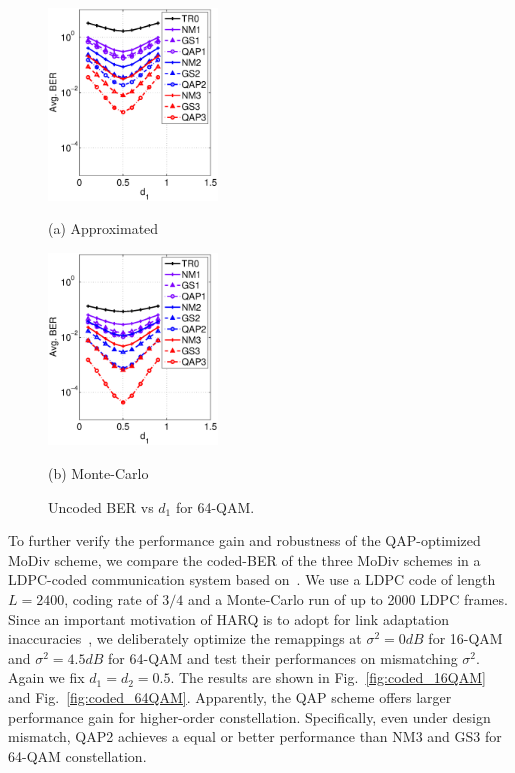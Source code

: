 \documentclass{article}
\begin{document}
\begin{figure}[htb]

  \begin{minipage}[b]{.48\linewidth}
    \centering
    \centerline{\includegraphics[width=4.5cm]{./figs/BER_distance_approx_64QAM.eps}}
    \centerline{(a) Approximated}\medskip
  \end{minipage}
  \hfill
  \begin{minipage}[b]{0.48\linewidth}
    \centering
    \centerline{\includegraphics[width=4.5cm]{./figs/BER_distance_MonteCarlo_64QAM.eps}}
    \centerline{(b) Monte-Carlo}\medskip
  \end{minipage}
  \caption{Uncoded BER vs $d_1$ for 64-QAM.}
  \label{fig:uncoded_position}
%
\end{figure}

To further verify the performance gain and robustness of the
QAP-optimized MoDiv scheme, we compare the coded-BER of the three MoDiv schemes
in a LDPC-coded communication system based on~\cite{hochwald2003achieving}. We
use a LDPC code of length $L=2400$, coding rate of $3/4$ and a Monte-Carlo run of up to 2000 LDPC
frames. Since an important motivation of HARQ is to adopt for link adaptation
inaccuracies~\cite{cheng2006coding}, we deliberately optimize the remappings at
$\sigma^2=0dB$ for 16-QAM and $\sigma^2=4.5dB$ for 64-QAM and test their performances on
mismatching $\sigma^2$. Again we fix $d_1=d_2=0.5$. The results are shown in
Fig.~\ref{fig:coded_16QAM} and Fig.~\ref{fig:coded_64QAM}. Apparently, the QAP scheme offers larger performance gain for higher-order constellation. Specifically, even under
design mismatch, QAP2 achieves a equal or better performance than NM3 and GS3
for 64-QAM constellation.
\end{document}
